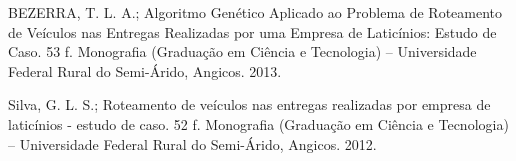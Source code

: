 \documentclass[12pt]{article}
\begin{document}
\newline BEZERRA, T. L. A.; Algoritmo Genético Aplicado ao Problema de Roteamento de
Veículos nas Entregas Realizadas por uma Empresa de Laticínios: Estudo de Caso.
53 f. Monografia (Graduação em Ciência e Tecnologia) – Universidade Federal
Rural do Semi-Árido, Angicos. 2013. 

\newline Silva, G. L. S.; Roteamento de veículos nas entregas realizadas por empresa de
laticínios - estudo de caso. 52 f. Monografia (Graduação em Ciência e Tecnologia) –
Universidade Federal Rural do Semi-Árido, Angicos. 2012.
\end{document}
